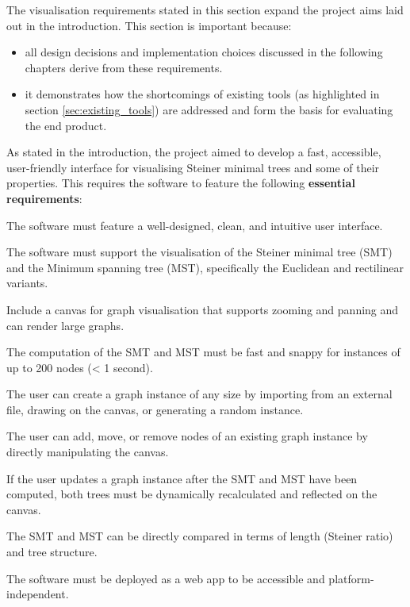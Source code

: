 \documentclass{l4proj}
\begin{document}
The visualisation requirements stated in this section expand the project aims laid out in the introduction. This section is important because:
\begin{itemize}
    \item all design decisions and implementation choices discussed in the following chapters derive from these requirements.
    \item it demonstrates how the shortcomings of existing tools (as highlighted in section \ref{sec:existing_tools}) are addressed and form the basis for evaluating the end product.
\end{itemize}
As stated in the introduction, the project aimed to develop a fast, accessible, user-friendly interface for visualising Steiner minimal trees and some of their properties.
This requires the software to feature the following \textbf{essential requirements}:
\begin{requirements}
    \item The software must feature a well-designed, clean, and intuitive user interface.
    \item The software must support the visualisation of the Steiner minimal tree (SMT) and the Minimum spanning tree (MST), specifically the Euclidean and rectilinear variants.
    \item Include a canvas for graph visualisation that supports zooming and panning and can render large graphs.
    \item The computation of the SMT and MST must be fast and snappy for instances of up to 200 nodes (< 1 second).
    \item The user can create a graph instance of any size by importing from an external file, drawing on the canvas, or generating a random instance.
    \item The user can add, move, or remove nodes of an existing graph instance by directly manipulating the canvas.
    \item If the user updates a graph instance after the SMT and MST have been computed, both trees must be dynamically recalculated and reflected on the canvas.
    \item The SMT and MST can be directly compared in terms of length (Steiner ratio) and tree structure.
    \item The software must be deployed as a web app to be accessible and platform-independent.

\end{requirements}
\end{document}
